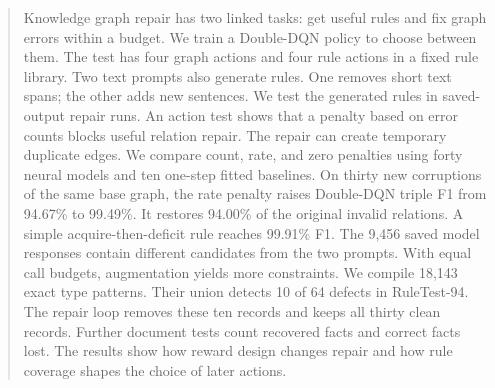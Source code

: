 \begin{abstract}
Knowledge graph repair has two linked tasks: get useful rules and fix graph
errors within a budget. We train a Double-DQN policy to choose between them.
The test has four graph actions and four rule actions in a fixed rule library.
Two text prompts also generate rules. One removes short text spans; the other
adds new sentences. We test the generated rules in saved-output repair runs.
An action test shows that a penalty based on error counts blocks useful
relation repair. The repair can create temporary duplicate edges.
We compare count, rate, and zero penalties using forty neural models and
ten one-step fitted baselines. On thirty new corruptions of the same base
graph, the rate penalty raises Double-DQN triple F1 from 94.67\% to 99.49\%.
It restores 94.00\% of the original invalid relations.
A simple acquire-then-deficit rule reaches 99.91\% F1.
The 9,456 saved model responses contain different candidates from the two
prompts. With equal call budgets, augmentation yields more constraints.
We compile 18,143 exact type patterns. Their union detects 10 of 64 defects
in RuleTest-94. The repair loop removes these ten records and keeps all
thirty clean records. Further document tests count recovered facts and
correct facts lost. The results show how reward design changes repair
and how rule coverage shapes the choice of later actions.
\end{abstract}
